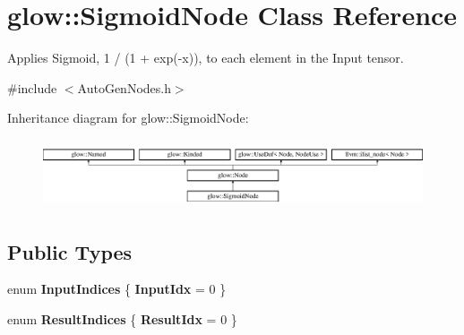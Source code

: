 \hypertarget{classglow_1_1_sigmoid_node}{}\section{glow\+:\+:Sigmoid\+Node Class Reference}
\label{classglow_1_1_sigmoid_node}


Applies Sigmoid, 1 / (1 + exp(-\/x)), to each element in the Input tensor.  




{\ttfamily \#include $<$Auto\+Gen\+Nodes.\+h$>$}

Inheritance diagram for glow\+:\+:Sigmoid\+Node\+:\begin{figure}[H]
\begin{center}
\leavevmode
\includegraphics[height=2.028986cm]{classglow_1_1_sigmoid_node}
\end{center}
\end{figure}
\subsection*{Public Types}
\begin{DoxyCompactItemize}
\item 
\mbox{\label{classglow_1_1_sigmoid_node_a02589262b3963afbd0d1dc73950513be}} 
enum {\bfseries Input\+Indices} \{ {\bfseries Input\+Idx} = 0
 \}
\item 
\mbox{\label{classglow_1_1_sigmoid_node_a57220d4c6020754dbb6905089408e96b}} 
enum {\bfseries Result\+Indices} \{ {\bfseries Result\+Idx} = 0
 \}
\end{DoxyCompactItemize}
